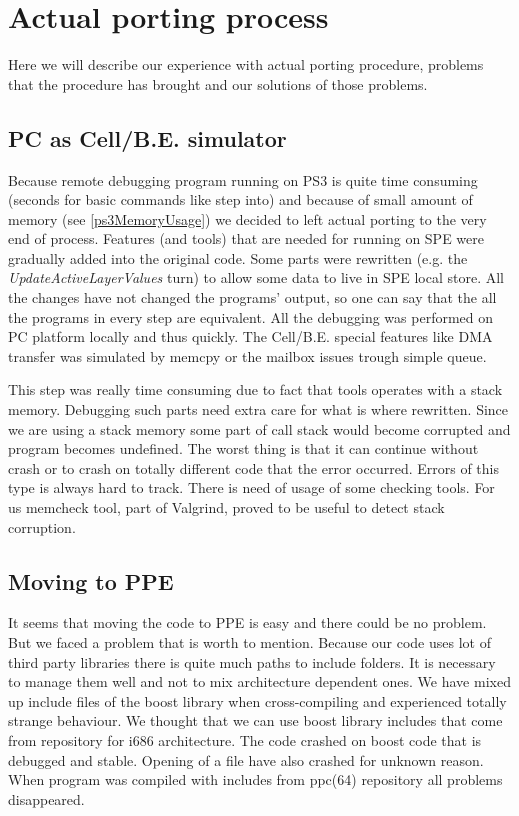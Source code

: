 \section{Actual porting process}

\par
Here we will describe our experience with actual porting procedure, problems that the procedure has brought and our solutions of those problems.

\subsection{PC as \mbox{Cell/B.E.} simulator}

\par
Because remote debugging program running on PS3 is quite time consuming (seconds for basic commands like step into) and because of small amount of memory (see \ref{ps3MemoryUsage}) we decided to left actual porting to the very end of process.
Features (and tools) that are needed for running on SPE were gradually added into the original code.
Some parts were rewritten (e.g. the \emph{UpdateActiveLayerValues} turn) to allow some data to live in SPE local store.
All the changes have not changed the programs' output, so one can say that the all the programs in every step are equivalent.
All the debugging was performed on PC platform locally and thus quickly.
The \mbox{Cell/B.E.} special features like DMA transfer was simulated by memcpy or the mailbox issues trough simple queue.

\par
This step was really time consuming due to fact that tools operates with a stack memory.
Debugging such parts need extra care for what is where rewritten.
Since we are using a stack memory some part of call stack would become corrupted and program becomes undefined.
The worst thing is that it can continue without crash or to crash on totally different code that the error occurred.
Errors of this type is always hard to track.
There is need of usage of some checking tools.
For us memcheck tool, part of Valgrind, proved to be useful to detect stack corruption.

\subsection{Moving to PPE}

\par
It seems that moving the code to PPE is easy and there could be no problem.
But we faced a problem that is worth to mention.
Because our code uses lot of third party libraries there is quite much paths to include folders.
It is necessary to manage them well and not to mix architecture dependent ones.
We have mixed up include files of the boost library when cross-compiling and experienced totally strange behaviour.
We thought that we can use boost library includes that come from repository for i686 architecture.
The code crashed on boost code that is debugged and stable.
Opening of a file have also crashed for unknown reason.
When program was compiled with includes from ppc(64) repository all problems disappeared.

